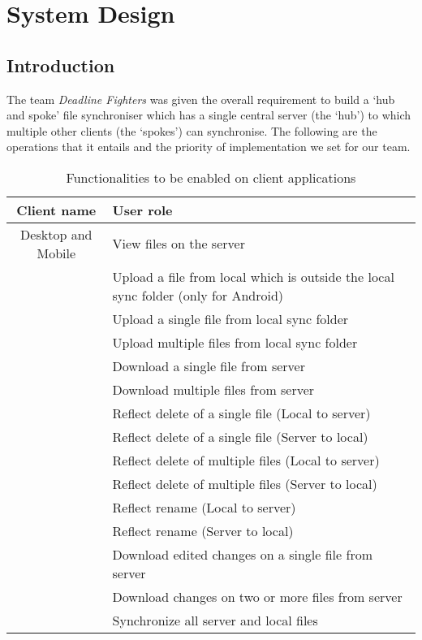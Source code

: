 \section{System Design}
\subsection{Introduction}
The team \emph{Deadline Fighters} was given the overall requirement to build a ‘hub and spoke’ file synchroniser which has a single central server (the ‘hub’) to which multiple other clients (the ‘spokes’) can synchronise. The following are the operations that it entails and the priority of implementation we set for our team.

\bgroup
\def\arraystretch{1.3}
\begin{table}[H]
\centering
\begin{tabular}{|c|m{8cm}|}
\hline
Client name & User role\\
\hline
{Desktop and Mobile} & View files on the server \\ \cline{2-2}
& Upload a file from local which is outside the local sync folder (only for Android) \\
\cline{2-2}
& Upload a single file from local sync folder \\
\cline{2-2}
& Upload multiple files from local sync folder\\
\cline{2-2}
&Download a single file from server\\
\cline{2-2}
&Download multiple files from server\\
\cline{2-2}
&Reflect delete of a single file (Local to server)\\
\cline{2-2}
&Reflect delete of a single file (Server to local)\\
\cline{2-2}
&Reflect delete of multiple files (Local to server)\\
\cline{2-2}
&Reflect delete of multiple files (Server to local)\\
\cline{2-2}
&Reflect rename (Local to server)\\
\cline{2-2}
&Reflect rename (Server to local)\\
\cline{2-2}
&Download edited changes on a single file from server\\
\cline{2-2}
&Download changes on two or more files from server\\
\cline{2-2}
&Synchronize all server and local files\\
\hline
\bottomrule
\end{tabular}
\caption{Functionalities to be enabled on client applications}
\end{table}
\egroup

